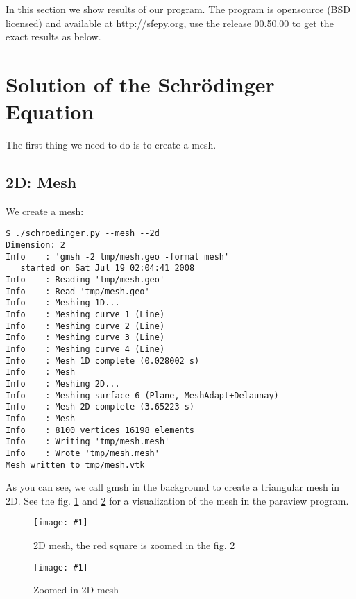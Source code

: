 In this section we show results of our program. The program is opensource (BSD
licensed) and available at \url{http://sfepy.org}, use the release 00.50.00 to
get the exact results as below.

\section{Solution of the Schr\"odinger Equation}

The first thing we need to do is to create a mesh.

\subsection{2D: Mesh}

We create a mesh:

\begin{lstlisting}
$ ./schroedinger.py --mesh --2d
Dimension: 2
Info    : 'gmsh -2 tmp/mesh.geo -format mesh'
   started on Sat Jul 19 02:04:41 2008
Info    : Reading 'tmp/mesh.geo'
Info    : Read 'tmp/mesh.geo'
Info    : Meshing 1D...
Info    : Meshing curve 1 (Line)
Info    : Meshing curve 2 (Line)
Info    : Meshing curve 3 (Line)
Info    : Meshing curve 4 (Line)
Info    : Mesh 1D complete (0.028002 s)
Info    : Mesh
Info    : Meshing 2D...
Info    : Meshing surface 6 (Plane, MeshAdapt+Delaunay)
Info    : Mesh 2D complete (3.65223 s)
Info    : Mesh
Info    : 8100 vertices 16198 elements
Info    : Writing 'tmp/mesh.mesh'
Info    : Wrote 'tmp/mesh.mesh'
Mesh written to tmp/mesh.vtk
\end{lstlisting}

As you can see, we call gmsh\cite{gmsh} in the background to create a
triangular mesh in 2D.
See the fig. \ref{fig:mesh2d} and \ref{fig:mesh2d2} for a visualization of the
mesh in the paraview\cite{paraview} program.

\def\fig#1#2#3{%
\begin{figure}[htp]
\centering
\texttt{[image: \#1]}
\caption{#3}\label{#2}
\end{figure}
}

\def\fign#1#2#3{%
\begin{figure}[htp]
\centering
\texttt{[image: \#1]}
\caption{#3}\label{#2}
\end{figure}
}

\fig{images/mesh1-r.pdf}{fig:mesh2d}{2D mesh, the red square is zoomed in the fig.  \ref{fig:mesh2d2}}

\fig{images/mesh4.png}{fig:mesh2d2}{Zoomed in 2D mesh}

